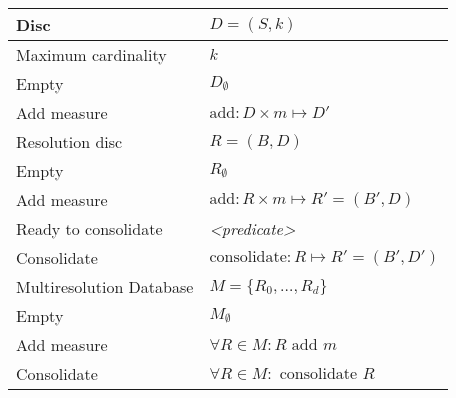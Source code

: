 \begin{longtable}[h]{ll}
    \pagebreak[3]\hline
    Disc & $D = (S,k)$ \\\hline
    Maximum cardinality & $k$ \\
    Empty   & $D_{\emptyset}$ \\
    Add measure  &  $\text{add}: D \times m \mapsto D'$ \\[2ex]    
    \pagebreak[3]\hline
    Resolution disc & $R = (B,D)$ \\\hline
    Empty   & $R_{\emptyset}$ \\
    Add measure  &  $\text{add}: R \times m \mapsto R'=(B',D)$ \\  
    Ready to consolidate & \emph{<predicate>} \\
    Consolidate & $\text{consolidate}:R \mapsto R'=(B',D')$ \\[2ex] 
    \pagebreak[3]\hline
     Multiresolution Database & $M=\{R_0,\dotsc,R_d\}$ \\\hline
     Empty   & $M_{\emptyset}$ \\
     Add measure  & $\forall R\in M: R \text{ add } m$ \\
     Consolidate  & $\forall R\in M: \text{ consolidate } R$ \\%
  \end{longtable}
 



